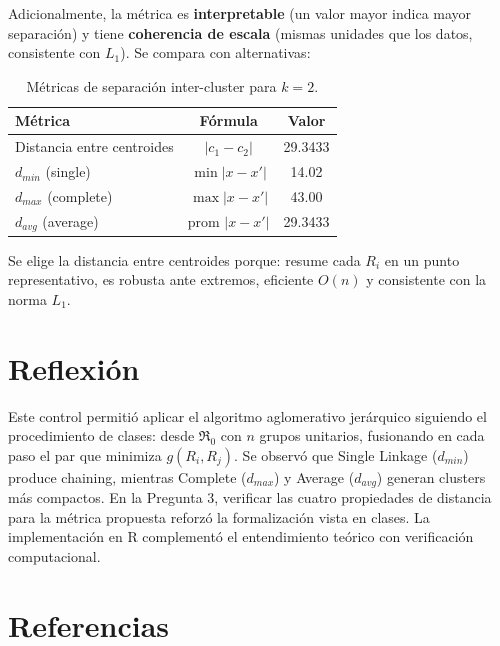 \documentclass[10pt,a4paper]{article}
\begin{document}
Adicionalmente, la métrica es \textbf{interpretable} (un valor mayor indica mayor separación) y tiene \textbf{coherencia de escala} (mismas unidades que los datos, consistente con $L_1$). Se compara con alternativas:

\begin{table}[H]
\centering
\footnotesize
\begin{tabular}{lcc}
\toprule
\textbf{Métrica} & \textbf{Fórmula} & \textbf{Valor} \\
\midrule
Distancia entre centroides & $|c_1 - c_2|$ & 29.3433 \\
$d_{min}$ (single) & $\min |x - x'|$ & 14.02 \\
$d_{max}$ (complete) & $\max |x - x'|$ & 43.00 \\
$d_{avg}$ (average) & $\text{prom } |x - x'|$ & 29.3433 \\
\bottomrule
\end{tabular}
\caption{Métricas de separación inter-cluster para $k=2$.}
\label{tab:metricas}
\end{table}

Se elige la distancia entre centroides porque: resume cada $R_i$ en un punto representativo, es robusta ante extremos, eficiente $O(n)$ y consistente con la norma $L_1$.

\section{Reflexión}

Este control permitió aplicar el algoritmo aglomerativo jerárquico siguiendo el procedimiento de clases: desde $\Re_0$ con $n$ grupos unitarios, fusionando en cada paso el par que minimiza $g(R_i, R_j)$. Se observó que Single Linkage ($d_{min}$) produce chaining, mientras Complete ($d_{max}$) y Average ($d_{avg}$) generan clusters más compactos. En la Pregunta 3, verificar las cuatro propiedades de distancia para la métrica propuesta reforzó la formalización vista en clases. La implementación en R complementó el entendimiento teórico con verificación computacional.

\section{Referencias}
\end{document}
